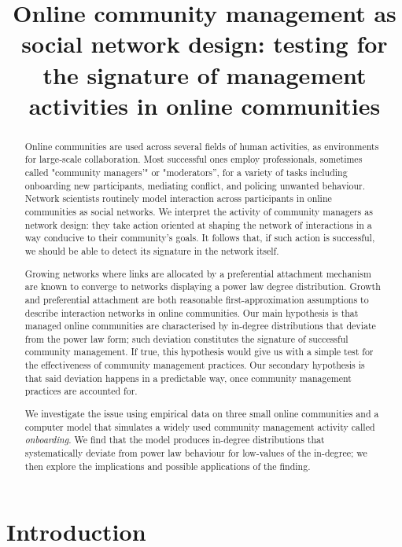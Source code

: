 \documentclass{nws}
\title[Online community management as social network design]{Online community management as social network design: testing for the signature of management activities in online communities}
\begin{document}
\label{firstpage}

\maketitle

\begin{abstract}
Online communities are used across several fields of human activities, as environments for large-scale collaboration. Most successful ones employ professionals, sometimes called "community managers'" or "moderators'', for a variety of tasks including onboarding new participants, mediating conflict, and policing unwanted behaviour. Network scientists routinely model interaction across participants in online communities as social networks. We interpret the activity of community managers as network design: they take action oriented at shaping the network of interactions in a way conducive to their community's goals. It follows that, if such action is successful, we should be able to detect its signature in the network itself. 

Growing networks where links are allocated by a preferential attachment mechanism are known to converge to networks displaying a power law degree distribution. Growth and preferential attachment are both reasonable first-approximation assumptions to describe interaction networks in online communities. Our main hypothesis is that managed online communities are characterised by in-degree distributions that deviate from the power law form; such deviation constitutes the signature of successful community management. If true, this hypothesis would give us with a simple test for the effectiveness of community management practices. Our secondary hypothesis is that said deviation happens in a predictable way, once community management practices are accounted for. 

We investigate the issue using empirical data on three small online communities and a computer model that simulates a widely used community management activity called \emph{onboarding}. We find that the model produces in-degree distributions that systematically deviate from power law behaviour for low-values of the in-degree; we then explore the implications and possible applications of the finding. 
\end{abstract}

\tableofcontents

\section{Introduction}
\end{document}
